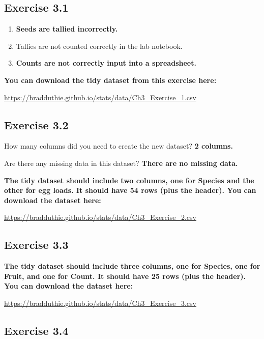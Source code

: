 \documentclass[
  openany]{krantz}
\providecommand{\tightlist}{%
  \setlength{\itemsep}{0pt}\setlength{\parskip}{0pt}}
\begin{document}
\hypertarget{exercise-3.1}{%
\subsection{Exercise 3.1}\label{exercise-3.1}}

\begin{enumerate}
\def\labelenumi{\arabic{enumi}.}
\tightlist
\item
  \textbf{Seeds are tallied incorrectly.}
\item
  Tallies are not counted correctly in the lab notebook.
\item
  \textbf{Counts are not correctly input into a spreadsheet.}
\end{enumerate}

\textbf{You can download the tidy dataset from this exercise here:}

\url{https://bradduthie.github.io/stats/data/Ch3_Exercise_1.csv}

\hypertarget{exercise-3.2}{%
\subsection{Exercise 3.2}\label{exercise-3.2}}

How many columns did you need to create the new dataset? \textbf{2 columns.}

Are there any missing data in this dataset? \textbf{There are no missing data.}

\textbf{The tidy dataset should include two columns, one for Species and the other for egg loads. It should have 54 rows (plus the header). You can download the dataset here:}

\url{https://bradduthie.github.io/stats/data/Ch3_Exercise_2.csv}

\hypertarget{exercise-3.3}{%
\subsection{Exercise 3.3}\label{exercise-3.3}}

\textbf{The tidy dataset should include three columns, one for Species, one for Fruit, and one for Count. It should have 25 rows (plus the header). You can download the dataset here:}

\url{https://bradduthie.github.io/stats/data/Ch3_Exercise_3.csv}

\hypertarget{exercise-3.4}{%
\subsection{Exercise 3.4}\label{exercise-3.4}}
\end{document}
